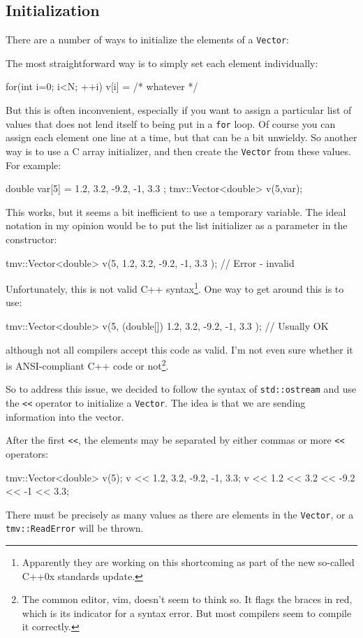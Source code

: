 \documentclass[twoside,letterpaper,11pt]{article}
\renewcommand{\tt}[1]{{\lstinline {#1}}}
\begin{document}
\subsection{Initialization}
\label{Vector_Initialization}

There are a number of ways to initialize the elements of a \tt{Vector}:

The most straightforward way is to simply set each element individually:
\begin{tmvcode}
for(int i=0; i<N; ++i) {
    v[i] = /* whatever */
}
\end{tmvcode}

But this is often inconvenient, especially if you want to assign a particular list of 
values that does not lend itself to being put in a \tt{for} loop.  Of course you can assign
each element one line at a time, but that can be a bit unwieldy.  So another 
way is to use a C array initializer, and then create the \tt{Vector} from these values.  For example:
\begin{tmvcode}
double var[5] = { 1.2, 3.2, -9.2, -1, 3.3 };
tmv::Vector<double> v(5,var);
\end{tmvcode}
This works, but it seems a bit inefficient to use a temporary variable.  The ideal notation
in my opinion would be to put the list initializer as a parameter in the constructor:
\begin{tmvcode}
tmv::Vector<double> v(5, 
    { 1.2, 3.2, -9.2, -1, 3.3 }); // Error - invalid
\end{tmvcode}
Unfortunately, this is not valid C++ syntax\footnote{
Apparently they are working on this shortcoming as part of the new so-called C++0x 
standards update.}.
One way to get around this is to use:
\begin{tmvcode}
tmv::Vector<double> v(5, 
    (double[]) { 1.2, 3.2, -9.2, -1, 3.3 }); // Usually OK
\end{tmvcode}
although not all compilers accept this code as valid.  I'm not even sure whether
it is ANSI-compliant C++ code or not\footnote{
The common editor, vim, doesn't seem to think so.  
It flags the braces in red, which is its indicator for a syntax error.  But most compilers
seem to compile it correctly.}.

So to address this issue, we decided to follow the syntax of \tt{std::ostream}
and use the \tt{<<} operator to initialize a \tt{Vector}.  The idea is that we are 
sending information into the vector.  

After the first 
\tt{<<}, the elements may be separated by either commas or more \tt{<<}
operators:
\begin{tmvcode}
tmv::Vector<double> v(5);
v << 1.2, 3.2, -9.2, -1, 3.3;
v << 1.2 << 3.2 << -9.2 << -1 << 3.3;
\end{tmvcode}
There must be precisely as many values as there are elements in the \tt{Vector},
or a \tt{tmv::ReadError} will be thrown.
\end{document}
